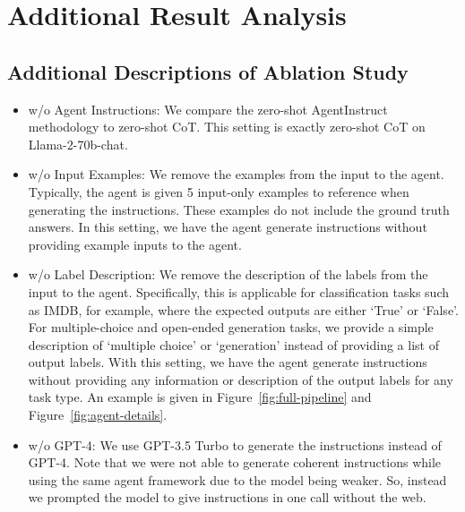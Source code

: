 





\clearpage

\section{Additional Result Analysis}
\subsection{Additional Descriptions of Ablation Study}
\label{sec:table1-clarifications}
\begin{itemize}
    \item w/o Agent Instructions: We compare the zero-shot AgentInstruct methodology to zero-shot CoT. This setting is exactly zero-shot CoT on Llama-2-70b-chat.
    \item w/o Input Examples: We remove the examples from the input to the agent. Typically, the agent is given 5 input-only examples to reference when generating the instructions. These examples do not include the ground truth answers. In this setting, we have the agent generate instructions without providing example inputs to the agent. 
    \item w/o Label Description: We remove the description of the labels from the input to the agent. Specifically, this is applicable for classification tasks such as IMDB, for example, where the expected outputs are either ‘True’ or ‘False’. For multiple-choice and open-ended generation tasks, we provide a simple description of ‘multiple choice’ or ‘generation’ instead of providing a list of output labels. With this setting, we have the agent generate instructions without providing any information or description of the output labels for any task type. An example is given in Figure~\ref{fig:full-pipeline} and Figure~\ref{fig:agent-details}.
    \item w/o GPT-4: We use GPT-3.5 Turbo to generate the instructions instead of GPT-4. Note that we were not able to generate coherent instructions while using the same agent framework due to the model being weaker. So, instead we prompted the model to give instructions in one call without the web.
\end{itemize}

